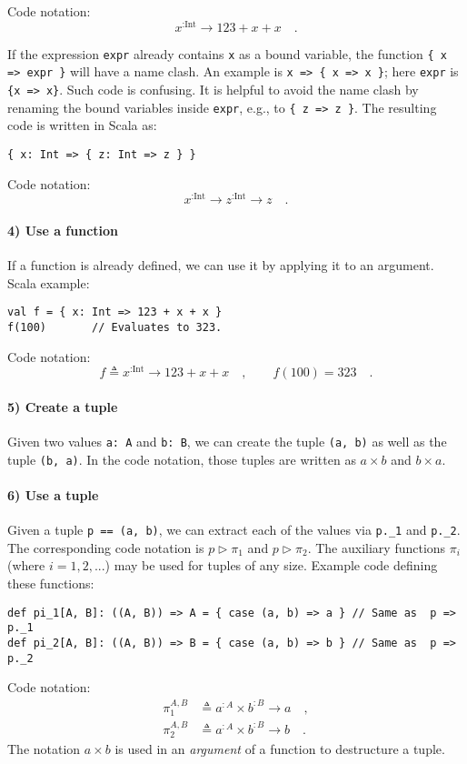 Code notation:
\[
x^{:\text{Int}}\rightarrow123+x+x\quad.
\]

If the expression \lstinline!expr! already contains \lstinline!x!
as a bound variable, the function \lstinline!{ x => expr }! will
have a name clash. An example is \lstinline!x => { x => x }!; here
\lstinline!expr! is \lstinline!{x => x}!. Such code is confusing.
It is helpful to avoid the name clash by renaming the bound variables
inside \lstinline!expr!, e.g., to \lstinline!{ z => z }!. The resulting
code is written in Scala as:
\begin{lstlisting}
{ x: Int => { z: Int => z } }
\end{lstlisting}
Code notation:
\[
x^{:\text{Int}}\rightarrow z^{:\text{Int}}\rightarrow z\quad.
\]


\paragraph{4) Use a function}

If a function is already defined, we can use it by applying it to
an argument. Scala example:
\begin{lstlisting}
val f = { x: Int => 123 + x + x }
f(100)       // Evaluates to 323.
\end{lstlisting}
Code notation:
\[
f\triangleq x^{:\text{Int}}\rightarrow123+x+x\quad,\quad\quad f(100)=323\quad.
\]


\paragraph{5) Create a tuple}

Given two values \lstinline!a: A! and \lstinline!b: B!, we can create
the tuple \lstinline!(a, b)! as well as the tuple \lstinline!(b, a)!.
In the code notation, those tuples are written as $a\times b$ and
$b\times a$.

\paragraph{6) Use a tuple}

Given a tuple \lstinline!p == (a, b)!, we can extract each of the
values via \lstinline!p._1! and \lstinline!p._2!. The corresponding
code notation is $p\triangleright\pi_{1}$ and $p\triangleright\pi_{2}$.
The auxiliary functions $\pi_{i}$ (where $i=1,2,...$) may be used
for tuples of any size. Example code defining these functions:
\begin{lstlisting}
def pi_1[A, B]: ((A, B)) => A = { case (a, b) => a } // Same as  p => p._1
def pi_2[A, B]: ((A, B)) => B = { case (a, b) => b } // Same as  p => p._2
\end{lstlisting}
Code notation:
\begin{align*}
\pi_{1}^{A,B} & \triangleq a^{:A}\times b^{:B}\rightarrow a\quad,\\
\pi_{2}^{A,B} & \triangleq a^{:A}\times b^{:B}\rightarrow b\quad.
\end{align*}
The notation $a\times b$ is used in an \emph{argument} of a function
to destructure a tuple.

